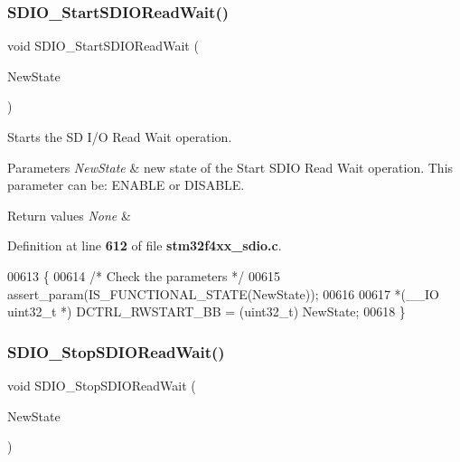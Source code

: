 \subsubsection{S\+D\+I\+O\+\_\+\+Start\+S\+D\+I\+O\+Read\+Wait()}
{\footnotesize\ttfamily void S\+D\+I\+O\+\_\+\+Start\+S\+D\+I\+O\+Read\+Wait (\begin{DoxyParamCaption}\item[{\textbf{ Functional\+State}}]{New\+State }\end{DoxyParamCaption})}



Starts the SD I/O Read Wait operation. 


\begin{DoxyParams}{Parameters}
{\em New\+State} & new state of the Start S\+D\+IO Read Wait operation. This parameter can be\+: E\+N\+A\+B\+LE or D\+I\+S\+A\+B\+LE. \\
\hline
\end{DoxyParams}

\begin{DoxyRetVals}{Return values}
{\em None} & \\
\hline
\end{DoxyRetVals}


Definition at line \textbf{ 612} of file \textbf{ stm32f4xx\+\_\+sdio.\+c}.


\begin{DoxyCode}
00613 \{ 
00614   \textcolor{comment}{/* Check the parameters */}
00615   assert_param(IS_FUNCTIONAL_STATE(NewState));
00616   
00617   *(\_\_IO uint32\_t *) DCTRL_RWSTART_BB = (uint32\_t) NewState;
00618 \}
\end{DoxyCode}
\mbox{\label{group__SDIO__Group4_gaca6b25eb2debb73ac827c66f0ebcf837}} 
\subsubsection{S\+D\+I\+O\+\_\+\+Stop\+S\+D\+I\+O\+Read\+Wait()}
{\footnotesize\ttfamily void S\+D\+I\+O\+\_\+\+Stop\+S\+D\+I\+O\+Read\+Wait (\begin{DoxyParamCaption}\item[{\textbf{ Functional\+State}}]{New\+State }\end{DoxyParamCaption})}



